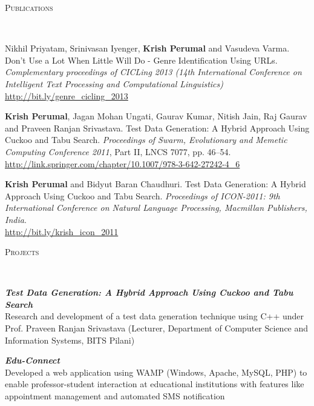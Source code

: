 \documentclass[9pt]{article}
\newenvironment{changemargin}[2]{%
  \begin{list}{}{%
    \setlength{\topsep}{0pt}%
    \setlength{\leftmargin}{#1}%
    \setlength{\rightmargin}{#2}%
    \setlength{\listparindent}{\parindent}%
    \setlength{\itemindent}{\parindent}%
    \setlength{\parsep}{\parskip}%
  }%
  \item[]}{\end{list}
}
\newcommand{\lineover}{
	\begin{changemargin}{-0.05in}{-0.05in}
		\vspace*{-8pt}
		\hrulefill \\
		\vspace*{-2pt}
	\end{changemargin}
}
\newcommand{\header}[1]{
	\begin{changemargin}{-0.5in}{-0.5in}
		\scshape{#1}\\
  	\lineover
	\end{changemargin}
}
\newenvironment{body} {
	\vspace*{-16pt}
	\begin{changemargin}{-0.25in}{-0.5in}
  }	
	{\end{changemargin}
}
\begin{document}
\smallskip


\header{Publications}

\begin{body}
	\vspace{14pt}
	Nikhil Priyatam, Srinivasan Iyenger, \textbf{Krish Perumal} and Vasudeva Varma. Don't Use a Lot When Little Will Do - Genre Identification Using URLs. 
\emph{Complementary proceedings of CICLing 2013 (14th International Conference on Intelligent Text Processing and Computational Linguistics)} \\ \url{http://bit.ly/genre_cicling_2013}
	
	\medskip
	
	\textbf{Krish Perumal}, Jagan Mohan Ungati, Gaurav Kumar, Nitish Jain, Raj Gaurav and Praveen Ranjan Srivastava. Test Data Generation: A Hybrid Approach Using Cuckoo and Tabu Search. \emph{Proceedings of Swarm, Evolutionary and Memetic Computing Conference 2011}, Part II, LNCS 7077, pp. 46–54. \\ \url{http://link.springer.com/chapter/10.1007/978-3-642-27242-4_6}
	
	\medskip
	
	\textbf{Krish Perumal} and Bidyut Baran Chaudhuri. Test Data Generation: A Hybrid Approach Using Cuckoo and Tabu Search. \emph{Proceedings of ICON-2011: 9th International Conference on Natural Language Processing, Macmillan Publishers, India}. \\
	\url{http://bit.ly/krish_icon_2011}
\end{body}

\newpage{}

\header{Projects}

\begin{body}
	\vspace{14pt}
	\emph{\textbf{Test Data Generation: A Hybrid Approach Using Cuckoo and Tabu Search}} \\
	Research and development of a test data generation technique using C++ under Prof. Praveen Ranjan Srivastava (Lecturer, Department of Computer
Science and Information Systems, BITS Pilani)
	
	\medskip
	
	\emph{\textbf{Edu-Connect}} \\
	Developed a web application using WAMP (Windows, Apache, MySQL, PHP) to enable professor-student
interaction at educational institutions with features like appointment management and automated
SMS notification

\end{body}
\end{document}
